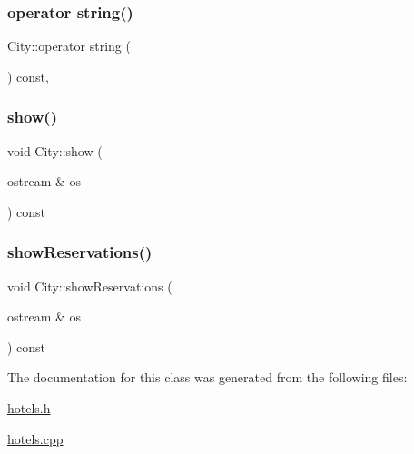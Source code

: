 \mbox{\label{class_city_a41215eb7ca34723453b709bd20c0a1ae}} 
\subsubsection{\texorpdfstring{operator string()}{operator string()}}
{\footnotesize\ttfamily City\+::operator string (\begin{DoxyParamCaption}{ }\end{DoxyParamCaption}) const\hspace{0.3cm}{\ttfamily [inline]}, {\ttfamily [explicit]}}

\mbox{\label{class_city_a18463913234ae61550b62693c7dd10a3}} 
\subsubsection{\texorpdfstring{show()}{show()}}
{\footnotesize\ttfamily void City\+::show (\begin{DoxyParamCaption}\item[{ostream \&}]{os }\end{DoxyParamCaption}) const}

\mbox{\label{class_city_ab8d15e9920d57b5892e073198dca0371}} 
\subsubsection{\texorpdfstring{show\+Reservations()}{showReservations()}}
{\footnotesize\ttfamily void City\+::show\+Reservations (\begin{DoxyParamCaption}\item[{ostream \&}]{os }\end{DoxyParamCaption}) const}



The documentation for this class was generated from the following files\+:\begin{DoxyCompactItemize}
\item 
\hyperlink{hotels_8h}{hotels.\+h}\item 
\hyperlink{hotels_8cpp}{hotels.\+cpp}\end{DoxyCompactItemize}
